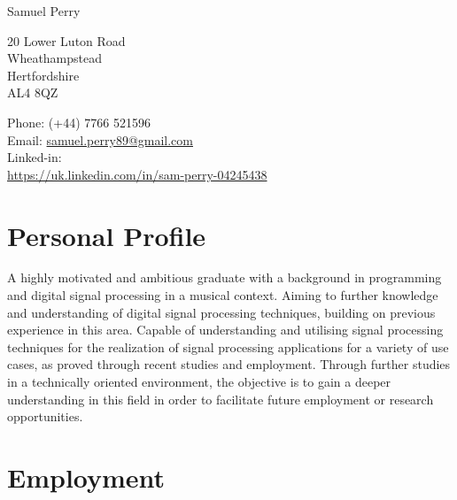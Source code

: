 \documentclass[10pt,letterpaper]{article}
\def\name{Samuel Perry}
\begin{document}
{\huge \name}


\bigskip

\begin{minipage}[t]{0.495\textwidth}
  20 Lower Luton Road\\
  Wheathampstead\\
  Hertfordshire\\
  AL4 8QZ\\

\end{minipage}
\begin{minipage}[t]{0.495\textwidth}
    Phone: (+44) 7766 521596\\
    Email: \href{mailto:samuel.perry89@gmail.com}{samuel.perry89@gmail.com} \\
    Linked-in: \\\href{https://uk.linkedin.com/in/sam-perry-04245438}{https://uk.linkedin.com/in/sam-perry-04245438}
\end{minipage}

\section*{Personal Profile}

A highly motivated and ambitious graduate with a background in programming and
digital signal processing in a musical context. Aiming to further knowledge and
understanding of digital signal processing techniques, building on previous
experience in this area. Capable of understanding and utilising signal
processing techniques for the realization of signal processing applications for
a variety of use cases, as proved through recent studies and employment.
Through further studies in a technically oriented environment,  the objective
is to gain a deeper understanding in this field in order to facilitate future
employment or research opportunities.

\section*{Employment}
\end{document}

